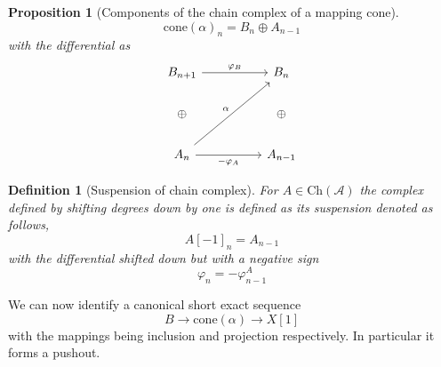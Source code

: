 \documentclass[12pt]{report}
\numberwithin{equation}{section}
\newtheorem{definition}[dummy]{Definition}
\newtheorem{proposition}[dummy]{Proposition}
\begin{document}
	
	
	
	\begin{proposition}[Components of the chain complex of a mapping cone]
		\[ \mathrm{cone}(\alpha)_n=B_n\oplus A_{n-1} \]
		with the differential as 
		\[\begin{tikzcd}
			{B_{n+1}} && {B_n} \\
			{\oplus } && { \oplus } \\
			{A_n} && {A_{n-1}}
			\arrow["{\varphi_B}", from=1-1, to=1-3]
			\arrow["\alpha", from=3-1, to=1-3]
			\arrow["{-\varphi_A}"', from=3-1, to=3-3]
		\end{tikzcd}\]
	\end{proposition}
	\begin{definition}[Suspension of chain complex]
		For $A \in \mathrm{Ch}(\mathcal{A})$ the complex defined by shifting degrees down by one is defined as its suspension denoted as follows,
		\[ A[-1]_n=A_{n-1} \] with the differential shifted down but with a negative sign
		\[ \varphi_n = -\varphi^A_{n-1} \]
	\end{definition}
	
	We can now identify a canonical short exact sequence \[ B \to \mathrm{cone}(\alpha) \to X[1] \]
	with the mappings being inclusion and projection respectively. In particular it forms a pushout. 
	
\end{document}
